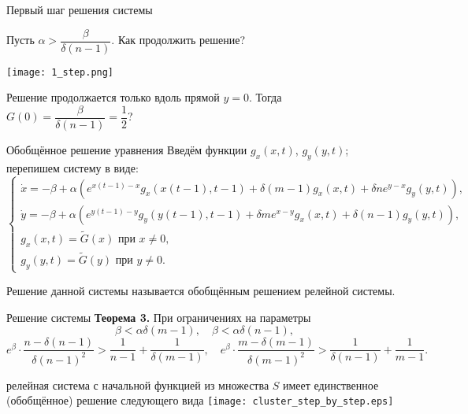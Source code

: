 \begin{frame}{Первый шаг решения системы}
	
	Пусть $\alpha > \dfrac{\beta}{\delta (n - 1)}$. Как продолжить решение?
	
	\begin{center}
		\texttt{[image: 1\_step.png]}
	\end{center}
	
	\pause
	
	\bigskip
	
	Решение продолжается только вдоль прямой $y = 0$. Тогда $G(0) = \dfrac{\beta}{\delta(n - 1)} = \dfrac{1}{2}$?
	
\end{frame}


\begin{frame}{Обобщённое решение уравнения}
	Введём функции $g_x(x, t)$, $g_y(y, t)$; перепишем систему в виде:
	\footnotesize
	\begin{equation*}
		\label{eq:generalized_system}
		\begin{cases}
			\dot{x} = -\beta + \alpha \left(e^{x(t - 1) - x} g_x(x(t - 1), t - 1) + \delta (m - 1) g_x(x, t) + \delta n e^{y - x} g_y(y, t)\right),\\
			\dot{y} = -\beta + \alpha \left(e^{y(t - 1) - y} g_y(y(t - 1), t - 1) + \delta m e^{x - y} g_x(x, t) + \delta (n - 1) g_y(y, t)\right),\\
			g_x(x, t) = \tilde{G}(x) \text{  при  } x \neq 0,\\
			g_y(y, t) = \tilde{G}(y) \text{  при  } y \neq 0. 
		\end{cases}
	\end{equation*}
	\normalsize
	
	\pause
	
	\bigskip
	
	Решение данной системы называется обобщённым решением релейной системы.
	
\end{frame}

\begin{frame}{Решение системы}
	\textbf{Теорема 3.} При ограничениях на параметры
	\footnotesize
	\begin{equation*}
		\label{eq:constraint_2}
		\beta < \alpha \delta (m - 1), \quad \beta < \alpha \delta (n - 1),
	\end{equation*}
	\begin{equation*}
		\label{eq:constraint_3}
		e^{\beta} \cdot \dfrac{n - \delta(n - 1)}{\delta (n - 1)^2} > \dfrac{1}{n - 1} + \dfrac{1}{\delta(m - 1)}, \quad
		e^{\beta} \cdot \dfrac{m - \delta(m - 1)}{\delta (m - 1)^2} > \dfrac{1}{\delta(n - 1)} + \dfrac{1}{m - 1}.
	\end{equation*}
	\normalsize
	
	релейная система с начальной функцией из множества $S$ имеет единственное (обобщённое) решение следующего вида
	\texttt{[image: cluster\_step\_by\_step.eps]}
\end{frame}



